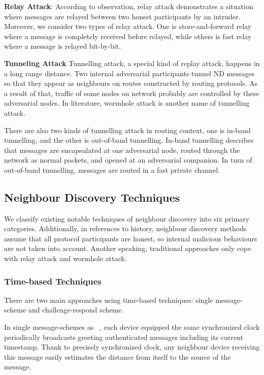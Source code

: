 \textbf{Relay Attack}: According to observation, relay attack demonstrates a situation where messages are relayed between two honest participants by an intruder. Moreover, we consider two types of relay attack. One is store-and-forward relay where a message is completely received before relayed, while others is fast relay where a message is relayed bit-by-bit. 

\textbf{Tunneling Attack} Tunnelling attack, a special kind of replay attack, happens in a long range distance. Two internal adversarial participants tunnel ND messages so that they appear as neighbours on routes constructed by routing protocols. As a result of that, traffic of some nodes on network probably are controlled by these adversarial nodes. In literature, wormhole attack is another name of tunnelling attack. 

There are also two kinds of tunnelling attack in routing context, one is in-band tunnelling, and the other is out-of-band tunnelling. In-band tunnelling describes that messages are encapsulated at one adversarial node, routed through the network as normal packets, and opened at an adversarial companion. In turn of out-of-band tunnelling, messages are routed in a fast private channel.

\subsection{Neighbour Discovery Techniques}

We classify existing notable techniques of neighbour discovery into six primary categories. Additionally, in references to history, neighbour discovery methods assume that all protocol participants are honest, so internal malicious behaviours are not taken into account. Another speaking, traditional approaches only cope with relay attack and wormhole attack. 

\subsubsection*{Time-based Techniques}

There are two main approaches using time-based techniques: single message-scheme and challenge-respond scheme. 

In single message-schemes as ~\cite{Brands:1994aa,Hancke:2005:RDB:1128018.1128472,Capkun:2003:SST:986858.986862,Yih-ChunHu2002}, each device equipped the same synchronized clock periodically broadcasts greeting authenticated messages including its current timestamp. Thank to precisely synchronized clock, any neighbour device receiving this message easily estimates the distance from itself to the source of the message. 


